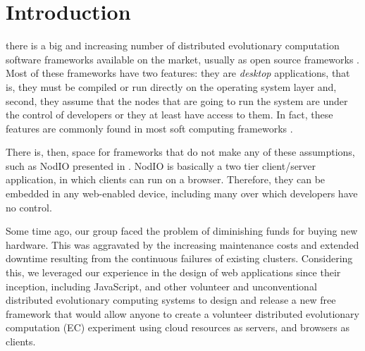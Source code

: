 \documentclass[journal,onecolumn]{IEEEtran}
\begin{document}
\section{Introduction}

 there is a big and increasing number of
distributed evolutionary computation software frameworks available on
the market, usually as open source frameworks \cite{Parejo12Survey}. 
Most of these frameworks have 
two features: they are {\em desktop} applications, that is, they must
be compiled or run directly on the operating system layer and, second,
they assume that the nodes that are going to run the system are under
the control of developers or they at least have access to them. In
fact, these features are commonly found in most soft computing
frameworks \cite{7094263}. 

There is, then, space for frameworks that do not make any of these
assumptions, such as {\sf NodIO} presented in \cite{2016arXiv160101607M}. {\sf NodIO} is basically 
a two tier client/server 
application, in which clients can run on a browser. 
Therefore, they can be embedded in any web-enabled device, including many over which 
developers have no control.

Some time ago, our group faced the problem of diminishing funds for
buying new hardware. This was aggravated by the increasing maintenance costs and
extended downtime resulting from the continuous failures of existing
clusters.
Considering this, we leveraged our experience in the design of web
applications since their inception, including JavaScript, and other
volunteer and
unconventional distributed evolutionary computing systems to 
design and release a new free framework that would allow anyone to
create a volunteer distributed evolutionary computation (EC) experiment using cloud resources as
servers, and browsers as clients.
\end{document}
